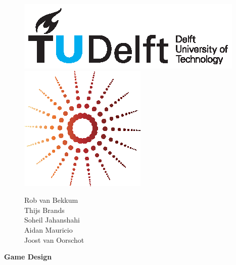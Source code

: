 \documentclass{article}
\begin{document}
\begin{figure}
    \begin{minipage}[H]{0.33\textwidth}
		\vspace{0.3cm}
		\includegraphics[scale=0.8]{images/TUDelftLogo.eps}
	\end{minipage}
	\begin{minipage}[H]{0.33\textwidth}
		\begin{center}
		\end{center}
		\begin{center}
			\includegraphics[scale=0.8]{images/Lg.eps}	
		
		\end{center}
	\end{minipage}
	\begin{minipage}[H]{0.33\textwidth}
			\begin{flushright}
				\small{Rob van Bekkum }\\
				\small{Thijs Brands }\\
				\small{Soheil Jahanshahi }\\
				\small{Aidan Mauricio }\\
				\small{Joost van Oorschot }
			\end{flushright}
	\end{minipage}
\end{figure}

\begin{minipage}[H]{\textwidth}
\vspace{0.3cm}
		\begin{center}
		  \vspace{0.3cm}
		  \Huge{\textbf{Game Design}}\\
	      \vspace{0.3cm}	
   		  \vspace{0.7cm}	
		\end{center}
	\end{minipage}
\tableofcontents
\newpage
\end{document}
